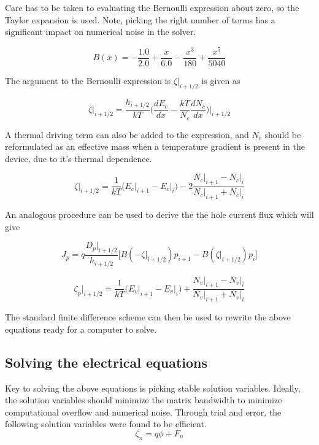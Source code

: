 \documentclass[11pt]{article}
\begin{document}
Care has to be taken to evaluating the Bernoulli expression about zero, so the Taylor expansion is used.  Note, picking the right number of terms has a significant impact on numerical noise in the solver. 

\begin{equation}
B(x)=-\frac{1.0}{2.0}+\frac{x}{6.0}-\frac{x^3}{180}+\frac{x^{5}}{5040}
\end{equation}

The argument to the Bernoulli expression is $\zeta \rvert_{i+1/2}$ is given as

\begin{equation}
\zeta \rvert_{i+1/2}=\frac{h_{i+1/2}}{kT} \bigg( \frac{dE_{c}}{dx}-\frac{kT}{N_c}\frac{dN_{c}}{dx} \bigg) \rvert_{i+1/2}
\end{equation}

A thermal driving term can also be added to the expression, and $N_{c}$ should be reformulated as an effective mass when a temperature gradient is present in the device, due to it's thermal dependence.

\begin{equation}
\zeta \rvert_{i+1/2}=\frac{1}{kT} \Big( E_{c}\rvert_{i+1}-E_{c}\rvert_{i} \Big)-2 \frac{N_{c}\rvert_{i+1}-N_{c}\rvert_{i} }{N_{c}\rvert_{i+1}+N_{c}\rvert_{i} }
\end{equation}

An analogous procedure can be used to derive the the hole current flux which will give

\begin{equation}
J_{p}=q \frac{D_{p}\rvert_{i+1/2}}{h_{i+1/2}} \bigg[ B(-\zeta \rvert_{i+1/2}) p_{i+1}- B(\zeta \rvert_{i+1/2}) p_{i} \bigg]
\end{equation}

\begin{equation}
\zeta_{p} \rvert_{i+1/2}=\frac{1}{kT} \Big( E_{v}\rvert_{i+1}-E_{v}\rvert_{i} \Big)+\frac{N_{v}\rvert_{i+1}-N_{v}\rvert_{i} }{N_{v}\rvert_{i+1}+N_{v}\rvert_{i} }
\end{equation}

The standard finite difference scheme can then be used to rewrite the above equations ready for a computer to solve.


\subsection{Solving the electrical equations}
Key to solving the above equations is picking stable solution variables.  Ideally, the solution variables should minimize the matrix bandwidth to minimize computational overflow and numerical noise.  Through trial and error, the following solution variables were found to be efficient.
\begin{equation}
\zeta_n={q\phi +F_{n}}
\end{equation}
\end{document}
